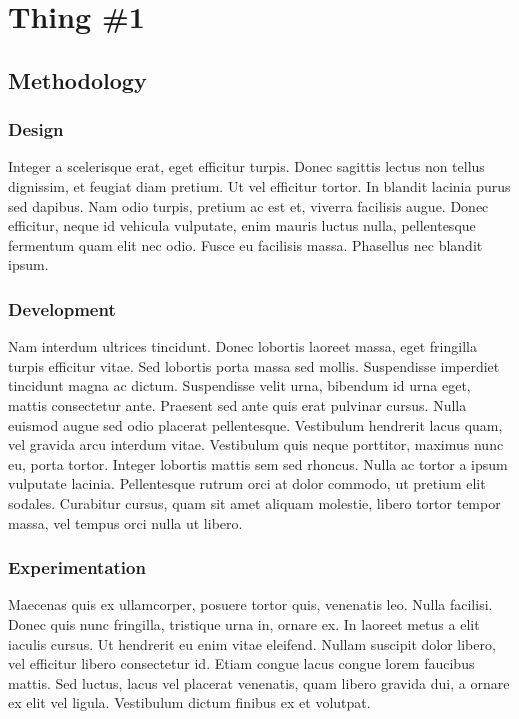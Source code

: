 \chapter{Thing \#1}

\section{Methodology}

\subsection{Design}
Integer a scelerisque erat, eget efficitur turpis. Donec sagittis lectus non tellus dignissim, et feugiat diam pretium. Ut vel efficitur tortor. In blandit lacinia purus sed dapibus. Nam odio turpis, pretium ac est et, viverra facilisis augue. Donec efficitur, neque id vehicula vulputate, enim mauris luctus nulla, pellentesque fermentum quam elit nec odio. Fusce eu facilisis massa. Phasellus nec blandit ipsum.

\subsection{Development}
Nam interdum ultrices tincidunt. Donec lobortis laoreet massa, eget fringilla turpis efficitur vitae. Sed lobortis porta massa sed mollis. Suspendisse imperdiet tincidunt magna ac dictum. Suspendisse velit urna, bibendum id urna eget, mattis consectetur ante. Praesent sed ante quis erat pulvinar cursus. Nulla euismod augue sed odio placerat pellentesque. Vestibulum hendrerit lacus quam, vel gravida arcu interdum vitae. Vestibulum quis neque porttitor, maximus nunc eu, porta tortor. Integer lobortis mattis sem sed rhoncus. Nulla ac tortor a ipsum vulputate lacinia. Pellentesque rutrum orci at dolor commodo, ut pretium elit sodales. Curabitur cursus, quam sit amet aliquam molestie, libero tortor tempor massa, vel tempus orci nulla ut libero.

\subsection{Experimentation}
Maecenas quis ex ullamcorper, posuere tortor quis, venenatis leo. Nulla facilisi. Donec quis nunc fringilla, tristique urna in, ornare ex. In laoreet metus a elit iaculis cursus. Ut hendrerit eu enim vitae eleifend. Nullam suscipit dolor libero, vel efficitur libero consectetur id. Etiam congue lacus congue lorem faucibus mattis. Sed luctus, lacus vel placerat venenatis, quam libero gravida dui, a ornare ex elit vel ligula. Vestibulum dictum finibus ex et volutpat.


